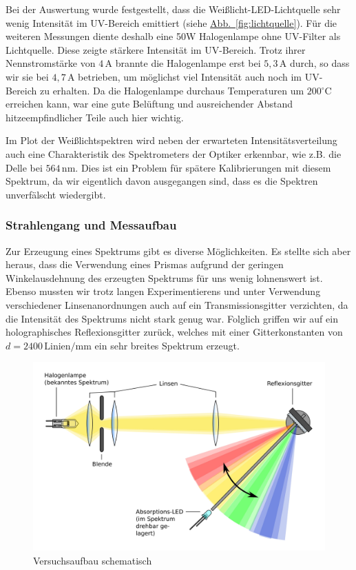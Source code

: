 \documentclass[11pt]{scrartcl}
\newcommand{\unit}[1]{\ensuremath{\,\mathrm{#1}}} %
\newcommand{\degr}{\ensuremath{^\circ}}
\newcommand{\cel}{\ensuremath{\degr\mathrm{C}}}
\newcommand{\hypref}[2]{\hyperref[#2]{{#1}~\ref{#2}}}
\begin{document}
Bei der Auswertung wurde festgestellt, dass die Weißlicht-LED-Lichtquelle sehr wenig Intensit\"at im UV-Bereich emittiert (siehe \hypref{Abb.}{fig:lichtquelle}). F\"ur die weiteren Messungen diente deshalb eine 50W Halogenlampe ohne UV-Filter als Lichtquelle. Diese zeigte st\"arkere Intensit\"at im UV-Bereich. Trotz ihrer Nennstromstärke von $4\unit{A}$ brannte die Halogenlampe erst bei $5,3\unit{A}$ durch, so dass wir sie bei $4,7\unit{A}$ betrieben, um möglichst viel Intensität auch noch im UV-Bereich zu erhalten. Da die Halogenlampe durchaus Temperaturen um $200\cel$ erreichen kann, war eine gute Bel\"uftung und ausreichender Abstand hitzeempfindlicher Teile auch hier wichtig.

Im Plot der Weißlichtspektren wird neben der erwarteten Intensitätsverteilung auch eine Charakteristik des Spektrometers der Optiker erkennbar, wie z.B. die Delle bei $564\unit{nm}$. Dies ist ein Problem für spätere Kalibrierungen mit diesem Spektrum, da wir eigentlich davon ausgegangen sind, dass es die Spektren unverfälscht wiedergibt.


\subsubsection{Strahlengang und Messaufbau} %
Zur Erzeugung eines Spektrums gibt es diverse M\"oglichkeiten. Es stellte sich aber heraus, dass die Verwendung eines Prismas aufgrund der geringen Winkelausdehnung des erzeugten Spektrums f\"ur uns wenig lohnenswert ist. Ebenso mussten wir trotz langen Experimentierens und unter Verwendung verschiedener Linsenanordnungen auch auf ein Transmissionsgitter verzichten, da die Intensit\"at des Spektrums nicht stark genug war. Folglich griffen wir auf ein holographisches Reflexionsgitter zur\"uck, welches mit einer Gitterkonstanten von $d=2400\unit{\text{Linien}/mm}$ ein sehr breites Spektrum erzeugt.%

\begin{figure}[ht]
\begin{center}
\includegraphics[width=1.\textwidth]{setup.jpg}
\end{center}
\vspace{-1.5\baselineskip}
\caption{Versuchsaufbau schematisch}
\label{Versuchsaufbau}
\end{figure}
\end{document}
